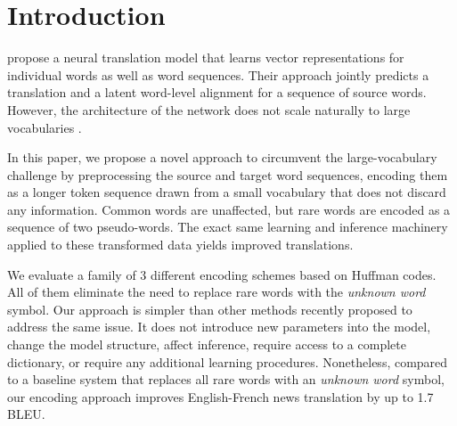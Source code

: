 \section{Introduction}
\label{sec:intro}

 propose a neural translation model
that learns vector representations for individual words as well as word
sequences. Their approach jointly predicts a translation and a latent
word-level alignment for a sequence of source words. However, the architecture
of the network does not scale naturally to large vocabularies
\cite{journals/corr/JeanCMB14}.

In this paper, we propose a novel approach to circumvent the large-vocabulary
challenge by preprocessing the source and target word sequences, encoding them
as a longer token sequence drawn from a small vocabulary that does not
discard any information. Common words are unaffected, but rare words are
encoded as a sequence of two pseudo-words. The exact same learning and
inference machinery applied to these transformed data yields improved
translations.

We evaluate a family of 3 different encoding schemes based on Huffman codes.
All of them  eliminate the need to replace rare words with the
\emph{unknown word} symbol. Our approach is simpler than other methods recently
proposed to address the same issue. It does not introduce new parameters into
the model, change the model structure, affect inference, require access to a
complete dictionary, or require any additional learning procedures.
Nonetheless, compared to a baseline system that replaces all rare words with an
\emph{unknown word} symbol, our encoding approach improves English-French
news translation by up to 1.7 BLEU.
